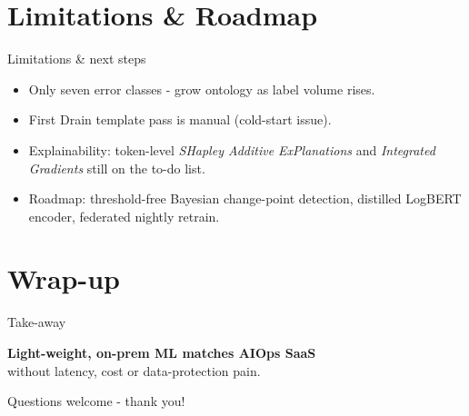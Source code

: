 \documentclass[14pt,aspectratio=169]{beamer}  %
\begin{document}
\section{Limitations \& Roadmap}
\begin{frame}{Limitations \& next steps}
\begin{itemize}[<+->]
  \item Only seven error classes - grow ontology as label volume rises.
  \item First Drain template pass is manual (cold-start issue).
  \item Explainability: token-level \emph{SHapley Additive ExPlanations}  
        and \emph{Integrated Gradients} still on the to-do list.
  \item Roadmap: threshold-free Bayesian change-point detection,  
        distilled LogBERT encoder, federated nightly retrain.
\end{itemize}
\end{frame}

\section{Wrap-up}
\begin{frame}{Take-away}
\vspace{1em}
\begin{center}
\Large
\textbf{Light-weight, on-prem ML matches AIOps SaaS}\\[0.4em]
without latency, cost or data-protection pain.
\end{center}

\vspace{1.2em}
\begin{center}
\small
Questions welcome - thank you!
\end{center}
\end{frame}
\end{document}
